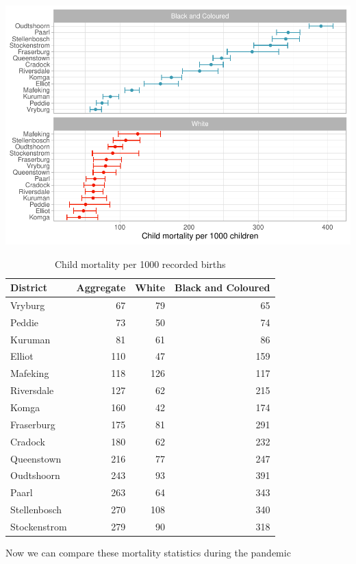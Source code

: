 \documentclass[fleqn,10pt,lineno]{wlpeerj} %
\begin{document}
\includegraphics{spanish-flu-mortality_bookdown_files/figure-latex/unnamed-chunk-12-1.pdf}

\begin{table}

\caption{\label{tab:unnamed-chunk-13}Child mortality per 1000 recorded births}
\centering
\begin{tabular}[t]{l|r|r|r}
\hline
District & Aggregate & White & Black and Coloured\\
\hline
Vryburg & 67 & 79 & 65\\
\hline
Peddie & 73 & 50 & 74\\
\hline
Kuruman & 81 & 61 & 86\\
\hline
Elliot & 110 & 47 & 159\\
\hline
Mafeking & 118 & 126 & 117\\
\hline
Riversdale & 127 & 62 & 215\\
\hline
Komga & 160 & 42 & 174\\
\hline
Fraserburg & 175 & 81 & 291\\
\hline
Cradock & 180 & 62 & 232\\
\hline
Queenstown & 216 & 77 & 247\\
\hline
Oudtshoorn & 243 & 93 & 391\\
\hline
Paarl & 263 & 64 & 343\\
\hline
Stellenbosch & 270 & 108 & 340\\
\hline
Stockenstrom & 279 & 90 & 318\\
\hline
\end{tabular}
\end{table}

Now we can compare these mortality statistics during the pandemic
\end{document}
